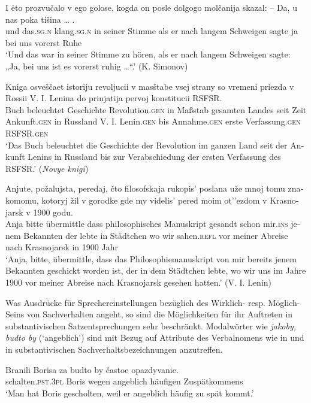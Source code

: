 \documentclass[output=paper]{langscibook}
\begin{document}
\begin{otherlanguage}{german}
\newpage
\ea \label{ex:zi83:13}
    \gll I ėto prozvučalo v ego golose, kogda on posle dolgogo molčanija skazal: -- Da, u nas poka tišina … . \\
    und das.\textsc{sg}.\textsc{n}  klang.\textsc{sg}.\textsc{n} in seiner Stimme als er nach langem Schweigen sagte {} ja bei uns vorerst Ruhe {}\\ 
    \glt ‘Und das war in seiner Stimme zu hören, als er nach langem Schweigen sagte: „Ja, bei uns ist es vorerst ruhig …“.’ (K. Simonov) 
    
\ex \label{ex:zi83:14}
    \gll Kniga osveščaet istoriju revoljucii v masštabe vsej strany so vremeni priezda v Rossii V. I. Lenina do prinjatija pervoj konstitucii RSFSR. \\
    Buch beleuchtet  Geschichte  Revolution.\textsc{gen} in Maßstab gesamten Landes seit  Zeit  Ankunft.\textsc{gen} in Russland V. I. Lenin.\textsc{gen}  bis Annahme.\textsc{gen} erste Verfassung.\textsc{gen} RSFSR.\textsc{gen} \\
    \glt ‘Das Buch beleuchtet die Geschichte der Revolution im ganzen Land seit der Ankunft Lenins in Russland bis zur Verabschiedung der ersten Verfassung des RSFSR.’ (\textit{Novye knigi})
    
\ex \label{ex:zi83:15}
    \gll Anjute, požalujsta, peredaj, čto filosofskaja rukopis’ poslana uže mnoj tomu znakomomu, kotoryj žil v gorodke gde my videlis’ pered moim ot’’ezdom v Krasnojarsk v 1900 godu.  \\
    Anja bitte übermittle dass  philosophisches Manuskript gesandt schon mir.\textsc{ins} jenem Bekannten der lebte in  Städtchen wo wir sahen.\textsc{refl} vor meiner Abreise nach Krasnojarsk in 1900 Jahr \\
    \glt ‘Anja, bitte, übermittle, dass das Philosophiemanuskript von mir bereits jenem Bekannten geschickt worden ist, der in dem Städtchen lebte, wo wir uns im Jahre 1900 vor meiner Abreise nach Krasnojarsk gesehen hatten.’ (V. I. Lenin)

\z

\noindent Was Ausdrücke für Sprechereinstellungen bezüglich des Wirklich- resp. Möglich-Seins von Sachverhalten angeht, so sind die Möglichkeiten für ihr Auftreten in substantivischen Satzentsprechungen sehr beschränkt. Modalwörter wie \textit{jakoby, budto by} (‘angeblich’) sind mit Bezug auf Attribute des Verbalnomens wie in  und  in substantivischen Sachverhaltsbezeichnungen anzutreffen. 

\ea \label{ex:zi83:16}
    \gll Branili Borisa za {budto by} častoe opazdyvanie. \\
     schalten.\textsc{pst}.3\textsc{pl} Boris wegen angeblich häufigen Zuspätkommens \\
    \glt ‘Man hat Boris gescholten, weil er angeblich häufig zu spät kommt.’


\end{otherlanguage}
\end{document}
